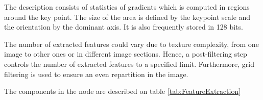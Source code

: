 \documentclass[12pt]{report}
\begin{document}
  The description consists of statistics of gradients which is computed in regions around the key point. The size of the area is defined by the keypoint scale and the orientation by the dominant axis.
   It is also frequently stored in 128 bits.
   \enlargethispage{\baselineskip}
  
  The number of extracted features could vary due to texture complexity, from one image to other ones or in different image sections. Hence, a post-filtering step controls the number of extracted features to a specified limit. 
  Furthermore, grid filtering is used to ensure an even repartition in the image.
  
  The components in the node are described on table \ref{tab:FeatureExtraction}
  
  
\end{document}
